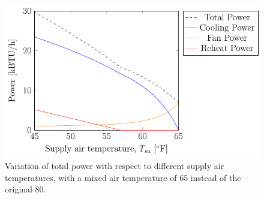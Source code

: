 \begin{figure}
\centering
\includegraphics{Plots/34-SimplifiedExampleLowerMAT/simplifiedExampleLowerMAT.pdf}
\caption{Variation of total power with respect to different supply air
temperatures, with a mixed air temperature of \SI{65}{\degreeF} instead
of the original \SI{80}{\degreeF}.}
\label{fig:simplifiedExamplePowerLowerMAT}
\end{figure}



